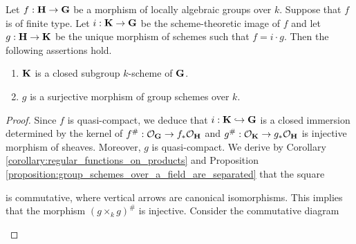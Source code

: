 \begin{theorem}\label{theorem:images_of_locally_algebraic_groups_homomorphisms}
Let $f:\bd{H}\ra \bd{G}$ be a morphism of locally algebraic groups over $k$. Suppose that $f$ is of finite type. Let $i:\bd{K}\ra \bd{G}$ be the scheme-theoretic image of $f$ and let $g:\bd{H}\ra \bd{K}$ be the unique morphism of schemes such that $f = i\cdot g$. Then the following assertions hold.
\begin{enumerate}[label=\emph{\textbf{(\arabic*)}}, leftmargin=3.0em]
\item $\bd{K}$ is a closed subgroup $k$-scheme of $\bd{G}$.
\item $g$ is a surjective morphism of group schemes over $k$.
\end{enumerate}
\end{theorem}
\begin{proof}
Since $f$ is quasi-compact, we deduce that $i:\bd{K} \hookrightarrow \bd{G}$ is a closed immersion determined by the kernel of $f^{\#}:\cO_{\bd{G}}\ra f_*\cO_{\bd{H}}$ and $g^{\#}:\cO_{\bd{K}}\ra g_*\cO_{\bd{H}}$ is injective morphism of sheaves. Moreover, $g$ is quasi-compact. We derive by Corollary \ref{corollary:regular_functions_on_products} and Proposition \ref{proposition:group_schemes_over_a_field_are_separated} that the square
\begin{center}
\end{center}
is commutative, where vertical arrows are canonical isomorphisms. This implies that the morphism $\left(g\times_k g\right)^{\#}$ is injective. Consider the commutative diagram
\begin{center}
\begin{tikzpicture}

\end{tikzpicture}
\end{center}
\end{proof}

